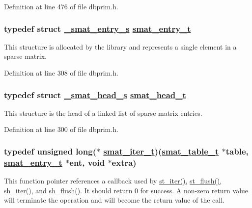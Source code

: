 Definition at line 476 of file dbprim.h.\hypertarget{group__dbprim__smat_ga2}{
\subsubsection[smat\_\-entry\_\-t]{\setlength{\rightskip}{0pt plus 5cm}typedef struct \hyperlink{struct__smat__entry__s}{\_\-smat\_\-entry\_\-s} \hyperlink{struct__smat__entry__s}{smat\_\-entry\_\-t}}}
\label{group__dbprim__smat_ga2}


This structure is allocated by the library and represents a single element in a sparse matrix.

Definition at line 308 of file dbprim.h.\hypertarget{group__dbprim__smat_ga1}{
\subsubsection[smat\_\-head\_\-t]{\setlength{\rightskip}{0pt plus 5cm}typedef struct \hyperlink{struct__smat__head__s}{\_\-smat\_\-head\_\-s} \hyperlink{struct__smat__head__s}{smat\_\-head\_\-t}}}
\label{group__dbprim__smat_ga1}


This structure is the head of a linked list of sparse matrix entries.

Definition at line 300 of file dbprim.h.\hypertarget{group__dbprim__smat_ga4}{
\subsubsection[smat\_\-iter\_\-t]{\setlength{\rightskip}{0pt plus 5cm}typedef unsigned long($\ast$ \hyperlink{group__dbprim__smat_ga4}{smat\_\-iter\_\-t})(\hyperlink{struct__smat__table__s}{smat\_\-table\_\-t} $\ast$table, \hyperlink{struct__smat__entry__s}{smat\_\-entry\_\-t} $\ast$ent, void $\ast$extra)}}
\label{group__dbprim__smat_ga4}


This function pointer references a callback used by \hyperlink{group__dbprim__smat_ga16}{st\_\-iter()}, \hyperlink{group__dbprim__smat_ga17}{st\_\-flush()}, \hyperlink{group__dbprim__smat_ga23}{sh\_\-iter()}, and \hyperlink{dbprim_8h_a178}{sh\_\-flush()}. It should return 0 for success. A non-zero return value will terminate the operation and will become the return value of the call.

